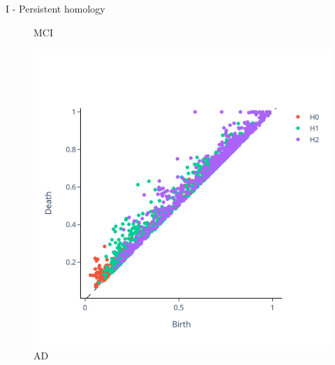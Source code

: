 \documentclass[aspectratio=169, 10pt, dvipsnames]{beamer}
\begin{document}
\begin{frame}[fragile]{I - Persistent homology}
\begin{figure}
    \caption{MCI}
  \end{figure}
  \endminipage
  \hfill
  \begin{figure}
    \centering
    \includegraphics[width=\textwidth]{figures/PDs/persistence_diagram_AD.png}
    \caption{AD}
  \end{figure}
  \endminipage
\end{frame}
\end{document}
